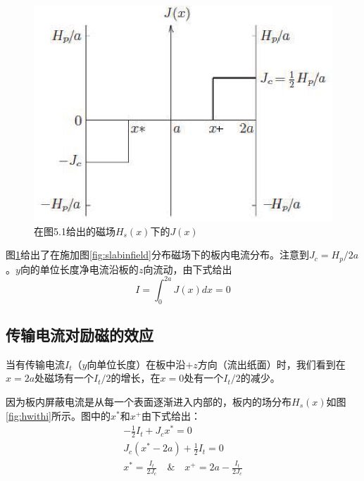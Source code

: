 \begin{figure}[htbp]
  \centering
 \includegraphics[scale=0.8]{chpt5/figs/fig5.4.eps}
  \caption{在图5.1给出的磁场$H_s(x)$下的$J(x)$}\label{fig:jtoh}
\end{figure}
图\ref{fig:jtoh}给出了在施加图\ref{fig:slabinfield}分布磁场下的板内电流分布。注意到$J_c=H_p /2a$。$y$向的单位长度净电流沿板的$z$向流动，由下式给出
\begin{equation}
  I=\int_{0}^{2a} J(x)dx=0
\end{equation}

\subsection{传输电流对励磁的效应}
当有传输电流$I_t$（$y$向单位长度）在板中沿$+z$方向（流出纸面）时，我们看到在$x=2a$处磁场有一个$I_t/2$的增长，在$x=0$处有一个$I_t/2$的减少。

因为板内屏蔽电流是从每一个表面逐渐进入内部的，板内的场分布$H_s(x)$如图\ref{fig:hwithi}所示。图中的$x^*$和$x^+$由下式给出：
\begin{eqnarray}
  -\frac{1}{2}I_t + J_c x^* = 0 \\ \nonumber
  J_c(x^*-2a)+\frac{1}{2}I_t = 0 \\ \nonumber
  x^*=\frac{I_t}{2J_c}\quad \& \quad x^+ = 2a-\frac{I_t}{2J_c}
\end{eqnarray}

